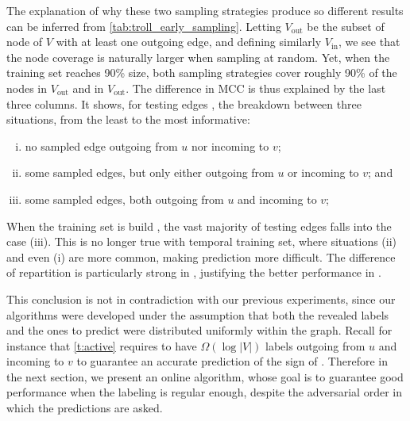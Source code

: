The explanation of
why these two sampling strategies produce so different results can be inferred from
\autoref{tab:troll_early_sampling}. Letting $V_{\mathrm{out}}$ be the subset of node of $V$ with at
least one outgoing edge, and defining similarly $V_{\mathrm{in}}$, we see that the node coverage is
naturally larger when sampling at random. Yet, when the training set reaches 90\% size, both
sampling strategies cover roughly 90\% of the nodes in $V_{\mathrm{out}}$ and in
$V_{\mathrm{out}}$. The difference in MCC is thus explained by the last three columns. It shows, for
testing edges \euv{}, the breakdown between three situations, from the least to the most
informative:
\begin{enumerate}[(i),nosep]
  \item no sampled edge outgoing from $u$ nor incoming to $v$;
  \item some sampled edges, but only either outgoing from $u$ or incoming to $v$; and
  \item some sampled edges, both outgoing from $u$ and incoming to $v$;
\end{enumerate}
When the training set is build \uar{}, the vast majority of testing edges falls into the case (iii).
This is no longer true with temporal training set, where situations (ii) and even (i) are more
common, making prediction more difficult. The difference of repartition is particularly strong in
\wik{}, justifying the better performance in \epi{}.

This conclusion is not in contradiction with our previous experiments, since our algorithms were
developed under the assumption that both the revealed labels and the ones to predict were
distributed uniformly within the graph. Recall for instance that \autoref{t:active} requires to have
$\Omega(\log |V|)$ labels outgoing from $u$ and incoming to $v$ to guarantee an accurate prediction
of the sign of \euv{}. Therefore in the next section, we present an online algorithm, whose goal is
to guarantee good performance when the labeling is regular enough, despite the adversarial order in
which the predictions are asked.


